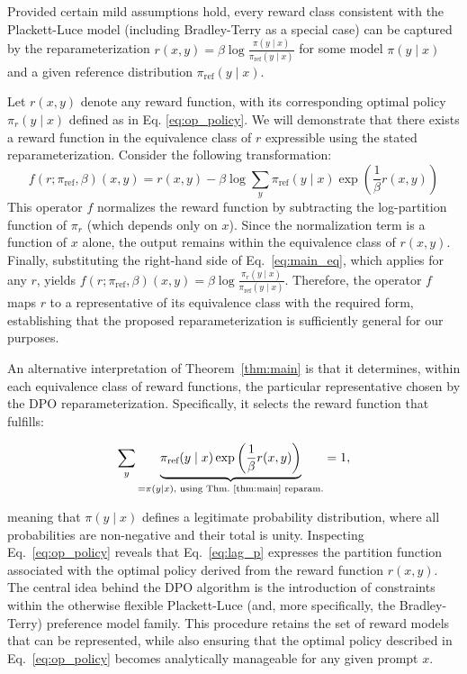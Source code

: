\begin{theorem}\label{thm:main}
    Provided certain mild assumptions hold, every reward class consistent with the Plackett-Luce model (including Bradley-Terry as a special case) can be captured by the reparameterization ${r(x, y) = \beta \log \frac{\pi(y\mid x)}{\pi_\text{ref}(y\mid x)}}$ for some model $\pi(y\mid x)$ and a given reference distribution $\pi_\text{ref}(y \mid x)$.
\end{theorem}

\begin{sproof}
    Let $r(x, y)$ denote any reward function, with its corresponding optimal policy $\pi_r(y \mid x)$ defined as in Eq. \ref{eq:op_policy}. We will demonstrate that there exists a reward function in the equivalence class of $r$ expressible using the stated reparameterization. Consider the following transformation:
\begin{equation}
    f(r; \pi_\text{ref}, \beta)(x, y) = r(x, y) - \beta\log\sum_{y}\pi_\text{ref}(y\mid x)\exp\left(\frac{1}{\beta}r(x, y)\right)
\end{equation}
This operator $f$ normalizes the reward function by subtracting the log-partition function of $\pi_r$ (which depends only on $x$). Since the normalization term is a function of $x$ alone, the output remains within the equivalence class of $r(x, y)$. Finally, substituting the right-hand side of Eq.~\ref{eq:main_eq}, which applies for any $r$, yields $f(r; \pi_\text{ref}, \beta)(x, y) = \beta \log \frac{\pi_r(y\mid x)}{\pi_\text{ref}(y\mid x)}$. Therefore, the operator $f$ maps $r$ to a representative of its equivalence class with the required form, establishing that the proposed reparameterization is sufficiently general for our purposes.
\end{sproof}

An alternative interpretation of Theorem~\ref{thm:main} is that it determines, within each equivalence class of reward functions, the particular representative chosen by the DPO reparameterization. Specifically, it selects the reward function that fulfills:

\begin{equation}\label{eq:lag_p}
     \sum_{y}\underbrace{\pi_\text{ref}(y\mid x)\exp\left(\frac{1}{\beta}r(x, y)\right)}_{=\pi(y\mid x)\text{, using Thm.~\ref{thm:main} reparam.}} = 1,
\end{equation}

meaning that $\pi(y\mid x)$ defines a legitimate probability distribution, where all probabilities are non-negative and their total is unity. Inspecting Eq.~\ref{eq:op_policy} reveals that Eq.~\ref{eq:lag_p} expresses the partition function associated with the optimal policy derived from the reward function $r(x, y)$. The central idea behind the DPO algorithm is the introduction of constraints within the otherwise flexible Plackett-Luce (and, more specifically, the Bradley-Terry) preference model family. This procedure retains the set of reward models that can be represented, while also ensuring that the optimal policy described in Eq.~\ref{eq:op_policy} becomes analytically manageable for any given prompt $x$.

